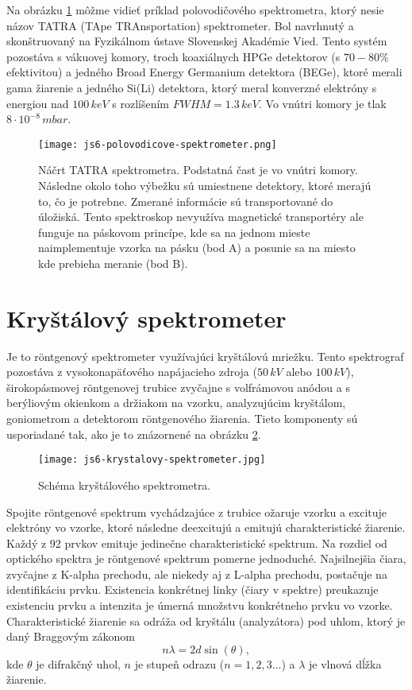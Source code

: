 \documentclass[../../main.tex]{subfiles}
\begin{document}
Na obrázku \ref{js6:fig:semiconductor_spectrometer} môžme vidieť príklad polovodičového spektrometra, ktorý nesie názov TATRA (TApe TRAnsportation) spektrometer. Bol navrhnutý a skonštruovaný na Fyzikálnom ústave Slovenskej Akadémie Vied. Tento systém pozostáva s vákuovej komory, troch koaxiálnych HPGe detektorov (s $70-80\%$ efektivitou) a jedného Broad Energy Germanium detektora (BEGe), ktoré merali gama žiarenie a jedného Si(Li) detektora, ktorý meral konverzné elektróny s energiou nad $100\,keV$ s rozlíšením $FWHM=1.3\,keV$. Vo vnútri komory je tlak $8\cdot 10^{-8}\,mbar$.

\begin{figure}[!h]
\centering
\texttt{[image: js6-polovodicove-spektrometer.png]}
\caption{Náčrt TATRA spektrometra. Podstatná čast je vo vnútri komory. Následne okolo toho výbežku sú umiestnene detektory, ktoré merajú to, čo je potrebne. Zmerané informácie sú transportované do úložiská. Tento spektroskop nevyužíva magnetické transportéry ale funguje na páskovom princípe, kde sa na jednom mieste naimplementuje vzorka na pásku (bod A) a posunie sa na miesto kde prebieha meranie (bod B).}
\label{js6:fig:semiconductor_spectrometer}
\end{figure}

\section{Kryštálový spektrometer}
Je to röntgenový spektrometer využívajúci kryštálovú mriežku. Tento spektrograf pozostáva z vysokonapäťového napájacieho zdroja ($50\,kV$ alebo $100\,kV$), širokopásmovej röntgenovej trubice zvyčajne s volfrámovou anódou a s berýliovým okienkom a držiakom na vzorku, analyzujúcim kryštálom, goniometrom a detektorom röntgenového žiarenia. Tieto komponenty sú usporiadané tak, ako je to znázornené na obrázku \ref{js6:fig:crystal_spectrometer}. 
\begin{figure}[!h]
\centering
\texttt{[image: js6-krystalovy-spektrometer.jpg]}
\caption{Schéma kryštálového spektrometra.}
\label{js6:fig:crystal_spectrometer}
\end{figure}
Spojite röntgenové spektrum vychádzajúce z trubice ožaruje vzorku a excituje elektróny vo vzorke, ktoré následne deexcitujú a emitujú charakteristické žiarenie. Každý z 92 prvkov emituje jedinečne charakteristické spektrum. Na rozdiel od optického spektra je röntgenové spektrum pomerne jednoduché. Najsilnejšia čiara, zvyčajne z K-alpha prechodu, ale niekedy aj z L-alpha prechodu, postačuje na identifikáciu prvku. Existencia konkrétnej linky (čiary v spektre) preukazuje existenciu prvku a intenzita je úmerná množstvu konkrétneho prvku vo vzorke. Charakteristické žiarenie sa odráža od kryštálu (analyzátora) pod uhlom, ktorý je daný Braggovým zákonom 
$$ n\lambda = 2d\sin(\theta),$$ 
kde $\theta$ je difrakčný uhol, $n$ je stupeň odrazu ($n=1,2,3...$) a $\lambda$ je vlnová dĺžka žiarenie.
 
\end{document}
